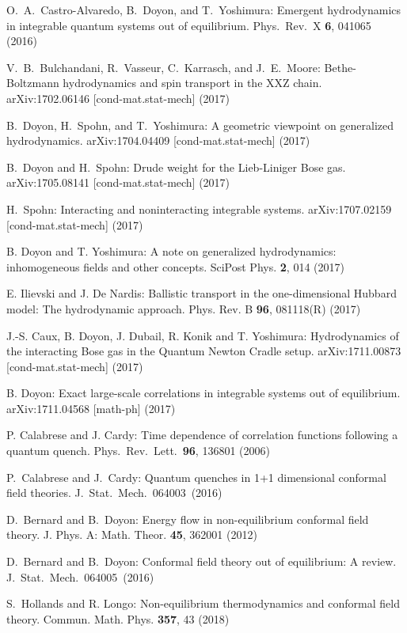 \documentclass[12pt,a4paper]{article}
\theoremstyle{definition}
\theoremstyle{remark}
\begin{document}
\begin{thebibliography}{99}
 O.\ A.\ Castro-Alvaredo, B.\ Doyon, and T.\ Yoshimura:
Emergent hydrodynamics in integrable quantum systems out of equilibrium. 
Phys.\ Rev.\ X {\bf 6}, 041065 (2016)

 V.\ B.\ Bulchandani, R.\ Vasseur, C.\ Karrasch, and J.\ E.\ Moore:
Bethe-Boltzmann hydrodynamics and spin transport in the XXZ chain.
arXiv:1702.06146 [cond-mat.stat-mech] (2017)

 B.\ Doyon, H.\ Spohn, and T.\ Yoshimura:
A geometric viewpoint on generalized hydrodynamics.
arXiv:1704.04409 [cond-mat.stat-mech] (2017)

 B.\ Doyon and H.\ Spohn:
Drude weight for the Lieb-Liniger Bose gas.
arXiv:1705.08141 [cond-mat.stat-mech] (2017)

 H.\ Spohn:
Interacting and noninteracting integrable systems.
arXiv:1707.02159 [cond-mat.stat-mech] (2017)

 B. Doyon and T. Yoshimura:
A note on generalized hydrodynamics:
inhomogeneous fields and other concepts.
SciPost Phys. {\bf2}, 014 (2017)

 E. Ilievski and J. De Nardis:
Ballistic transport in the one-dimensional Hubbard model: The hydrodynamic
approach. Phys. Rev. B {\bf96}, 081118(R) (2017) 

 J.-S. Caux, B. Doyon, J. Dubail, R. Konik and T. Yoshimura:
Hydrodynamics of the interacting Bose gas in the Quantum Newton Cradle setup.
arXiv:1711.00873 [cond-mat.stat-mech] (2017)

 B. Doyon:
Exact large-scale correlations in integrable systems out of equilibrium.
arXiv:1711.04568 [math-ph] (2017)

 P. Calabrese and J. Cardy:
Time dependence of correlation functions following a quantum quench.
Phys.\ Rev.\ Lett.\ {\bf 96}, 136801 (2006)

 P.\ Calabrese and J.\ Cardy:
Quantum quenches in 1+1 dimensional conformal field theories.
J.\ Stat.\ Mech.\ 064003\ (2016)

 D.\ Bernard and B.\ Doyon:
Energy flow in non-equilibrium conformal field theory.
J. Phys. A: Math. Theor. {\bf 45}, 362001 (2012) 

 D.\ Bernard and B.\ Doyon:
Conformal field theory out of equilibrium: A review.
J.\ Stat.\ Mech.\ 064005\ (2016)

 S.\ Hollands and R. Longo: Non-equilibrium thermodynamics
and conformal field theory. Commun. Math. Phys. {\bf 357}, 43 (2018)
  

\end{thebibliography}
\end{document}
